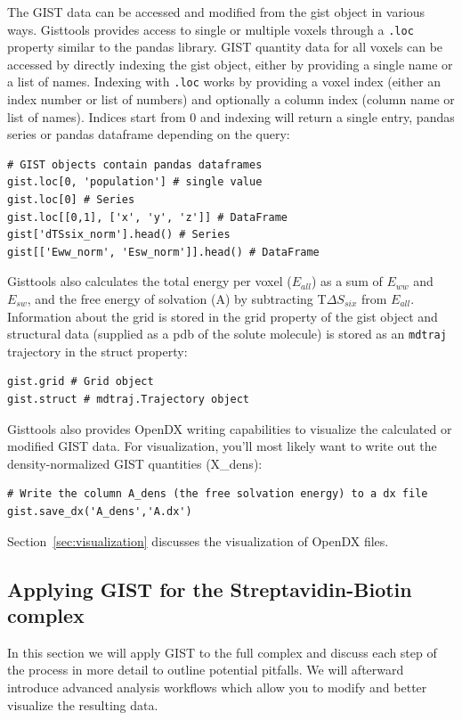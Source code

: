 \documentclass[9pt,tutorial,pubversion]{livecoms}
\newcommand{\software}{\texttt}
\newcommand{\code}{\texttt}
\begin{document}
The GIST data can be accessed and modified from the gist object in various ways.
Gisttools provides access to single or multiple voxels through a \code{.loc} property similar to the pandas library. 
GIST quantity data for all voxels can be accessed by directly indexing the gist object, either by providing a single name or a list of names.
Indexing with \code{.loc} works by providing a voxel index (either an index number or list of numbers) and optionally a column index (column name or list of names). 
Indices start from 0 and indexing will return a single entry, pandas series or pandas dataframe depending on the query:
\begin{lstlisting}[style=python]
# GIST objects contain pandas dataframes
gist.loc[0, 'population'] # single value
gist.loc[0] # Series
gist.loc[[0,1], ['x', 'y', 'z']] # DataFrame
gist['dTSsix_norm'].head() # Series
gist[['Eww_norm', 'Esw_norm']].head() # DataFrame
\end{lstlisting}
Gisttools also calculates the total energy per voxel ($E_{all}$) as a sum of $E_{ww}$ and $E_{sw}$, and the free energy of solvation (A) by subtracting T$\Delta S_{six}$ from $E_{all}$.\\
Information about the grid is stored in the grid property of the gist object and structural data (supplied as a pdb of the solute molecule) is stored as an \software{mdtraj} trajectory in the struct property:
\begin{lstlisting}[style=python]
gist.grid # Grid object
gist.struct # mdtraj.Trajectory object
\end{lstlisting}
Gisttools also provides OpenDX writing capabilities to visualize the calculated or modified GIST data. 
For visualization, you'll most likely want to write out the density-normalized GIST quantities (X\_dens):

\begin{lstlisting}[style=python]
# Write the column A_dens (the free solvation energy) to a dx file
gist.save_dx('A_dens','A.dx')
\end{lstlisting}
Section~\ref{sec:visualization} discusses the visualization of OpenDX files.

\subsection{Applying GIST for the Streptavidin-Biotin complex}
\label{subsec:gist_complex}
In this section we will apply GIST to the full complex and discuss each step of the process in more detail to outline potential pitfalls.
We will afterward introduce advanced analysis workflows which allow you to modify and better visualize the resulting data.
\end{document}
